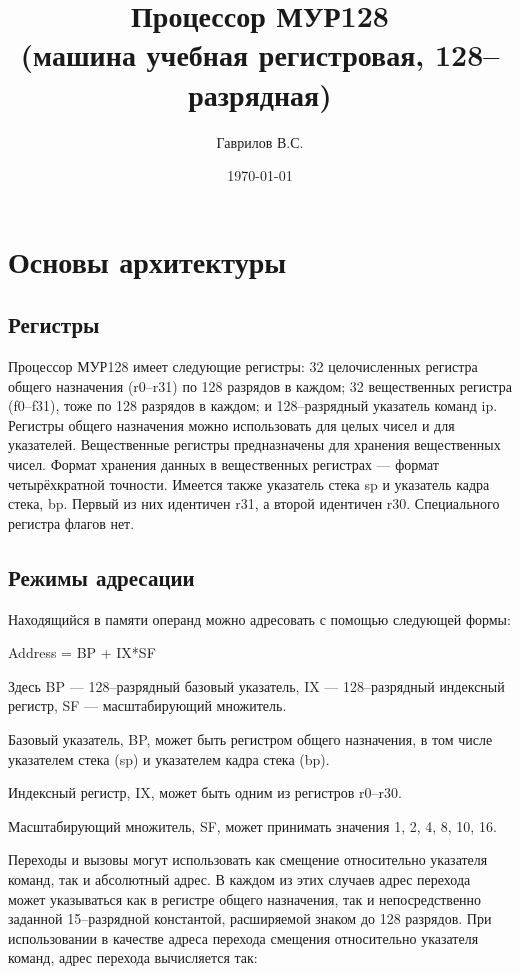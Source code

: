 \documentclass[10pt]{report}
\begin{document}
\title{Процессор МУР128\\ (машина учебная регистровая, 128--разрядная)}
\author{Гаврилов В.С.}
\date{\today}
\maketitle

\tableofcontents
\setcounter{secnumdepth}{2}

\listoftables

\chapter{Основы архитектуры}
    \section{Регистры}
Процессор МУР128 имеет следующие регистры: 32 целочисленных регистра общего назначения (r0--r31) по 128 разрядов в каждом; 32 вещественных регистра (f0--f31), тоже по 128 разрядов в каждом; и 128--разрядный указатель команд ip. Регистры общего назначения можно использовать для целых чисел и для указателей. Вещественные регистры предназначены для хранения вещественных чисел. Формат хранения данных в вещественных регистрах --- формат четырёхкратной точности. Имеется также указатель стека sp и указатель кадра стека, bp. Первый из них идентичен r31, а второй идентичен r30. Специального регистра флагов нет.

    \section{Режимы адресации}
Находящийся в памяти операнд можно адресовать с помощью следующей формы:
\vspace{5mm}

\parbox{50mm}{%
Address = BP + IX*SF
}
\vspace{5mm}

Здесь BP --- 128--разрядный базовый указатель, IX --- 128--разрядный индексный регистр, SF --- масштабирующий множитель.

Базовый указатель, BP, может быть регистром общего назначения, в том числе указателем стека (sp) и указателем кадра стека (bp).

Индексный регистр, IX, может быть одним из регистров r0--r30.

Масштабирующий множитель, SF, может принимать значения 1, 2, 4, 8, 10, 16.

Переходы и вызовы могут использовать как смещение относительно указателя команд, так и абсолютный адрес. В каждом из этих случаев адрес перехода может указываться как в регистре общего назначения, так и непосредственно заданной 15--разрядной константой, расширяемой знаком до 128 разрядов. При использовании в качестве адреса перехода смещения относительно указателя команд, адрес перехода вычисляется так:
\vspace{5mm}
\end{document}
